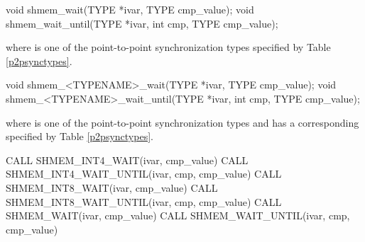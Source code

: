
\begin{apidefinition}

\begin{C11synopsis}
void shmem_wait(TYPE *ivar, TYPE cmp_value);
void shmem_wait_until(TYPE *ivar, int cmp, TYPE cmp_value);
\end{C11synopsis}
where \TYPE{} is one of the point-to-point synchronization types specified by
Table \ref{p2psynctypes}.

\begin{Csynopsis}
void shmem_<TYPENAME>_wait(TYPE *ivar, TYPE cmp_value);
void shmem_<TYPENAME>_wait_until(TYPE *ivar, int cmp, TYPE cmp_value);
\end{Csynopsis}
where \TYPE{} is one of the point-to-point synchronization types and has a
corresponding \TYPENAME{} specified by Table \ref{p2psynctypes}.

\begin{Fsynopsis}
CALL SHMEM_INT4_WAIT(ivar, cmp_value)
CALL SHMEM_INT4_WAIT_UNTIL(ivar, cmp, cmp_value)
CALL SHMEM_INT8_WAIT(ivar, cmp_value)
CALL SHMEM_INT8_WAIT_UNTIL(ivar, cmp, cmp_value)
CALL SHMEM_WAIT(ivar, cmp_value)
CALL SHMEM_WAIT_UNTIL(ivar, cmp, cmp_value)
\end{Fsynopsis}

\begin{apiarguments}


\end{apiarguments}


\end{apidefinition}
